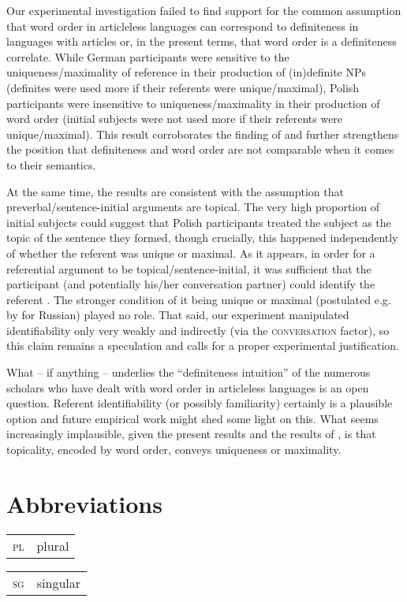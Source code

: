 \documentclass[output=paper]{langscibook}
\begin{document}
Our experimental investigation failed to find support for the common assumption that word order in articleless languages can correspond to definiteness in languages with articles or, in the present terms, that word order is a definiteness correlate. While German participants were sensitive to the uniqueness/maximality of reference in their production of (in)definite NPs (definites were used more if their referents were unique/maximal), Polish participants were insensitive to uniqueness/maximality in their production of word order (initial subjects were not used more if their referents were unique/maximal). This result corroborates the finding of \citet{Simik.Demian2020} and further strengthens the position that definiteness and word order are not comparable when it comes to their semantics.

At the same time, the results are consistent with the assumption that pre\-ver\-bal/sen\-tence-initial arguments are topical. The very high proportion of initial subjects could suggest that Polish participants treated the subject as the topic of the sentence they formed, though crucially, this happened independently of whether the referent was unique or maximal. As it appears, in order for a referential argument to be topical/sentence-initial, it was sufficient that the participant (and potentially his/her conversation partner) could identify the referent \citep{Lambrecht1994}. The stronger condition of it being unique or maximal (postulated e.g. by \citealt{Geist2010} for Russian) played no role. That said, our experiment manipulated identifiability only very weakly and indirectly (via the \textsc{conversation} factor), so this claim remains a speculation and calls for a proper experimental justification.

What -- if anything -- underlies the ``definiteness intuition'' of the numerous scholars who have dealt with word order in articleless languages is an open question. Referent identifiability (or possibly familiarity) certainly is a plausible option and future empirical work might shed some light on this. What seems increasingly implausible, given the present results and the results of \citet{Simik.Demian2020}, is that topicality, encoded by word order, conveys uniqueness or maximality.

\section*{Abbreviations}

\begin{tabularx}{.5\textwidth}{@{}lX@{}}
\textsc{pl}&plural\\
\end{tabularx}%
\begin{tabularx}{.5\textwidth}{@{}lX@{}}
\textsc{sg}&singular\\
\end{tabularx}
\end{document}
